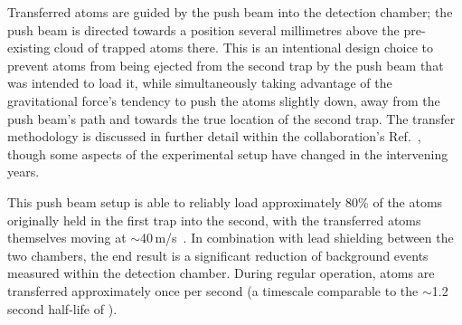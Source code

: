 Transferred atoms are guided by the push beam into the detection chamber;  the push beam is directed towards a position several millimetres above the pre-existing cloud of trapped atoms there.  This is an intentional design choice to prevent atoms from being ejected from the second trap by the push beam that was intended to load it, while simultaneously taking advantage of the gravitational force's tendency to push the atoms slightly down, away from the push beam's path and towards the true location of the second trap.  The transfer methodology is discussed in further detail within the collaboration's Ref.~\cite{swanson}, though some aspects of the experimental setup have changed in the intervening years.

This push beam setup is able to reliably load approximately 80\% of the atoms originally held in the first trap into the second, with the transferred atoms themselves moving at $\sim$40\,m/s~\cite{swanson}.  In combination with lead shielding between the two chambers, the end result is a significant reduction of background events measured within the detection chamber.  During regular operation, atoms are transferred approximately once per second (a timescale comparable to the $\sim$1.2 second half-life of ).  


